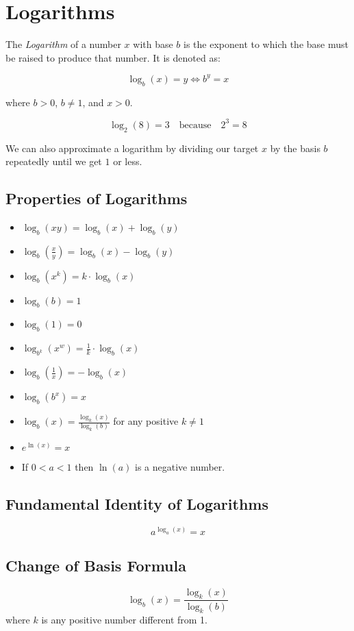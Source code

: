 \newpage
\section{Logarithms}

The \emph{Logarithm} of a number \(x\) 
with base \(b\) is the exponent to which the base must be raised to produce that number. It is denoted as:

\[
    \log_b(x) = y \iff b^y = x
\]

where \(b > 0\), \(b \neq 1\), and \(x > 0\).

\[
    \log_2(8) = 3 \quad \text{because} \quad 2^3 = 8
\]

We can also approximate a logarithm by dividing our target \(x\) by the basis \(b\) repeatedly until we get \(1\) or less.

\subsection{Properties of Logarithms}
\begin{itemize}[label=\(-\)]
  \item \(\log_b(xy) = \log_b(x) + \log_b(y)\)
  \item \(\log_b\left(\frac{x}{y}\right) = \log_b(x) - \log_b(y)\)
  \item \(\log_b(x^k) = k \cdot \log_b(x)\)
  \item \(\log_b(b) = 1\)
  \item \(\log_b(1) = 0\)
  \item \(\log_{b^k}(x^w) = \frac{1}{k} \cdot \log_b(x)\)
  \item \(\log_b\left(\frac{1}{x}\right) = -\log_b(x)\)
  \item \(\log_b(b^x) = x\)
  \item \(\log_b(x) = \frac{\log_k(x)}{\log_k(b)}\) for any positive \(k \neq 1\)
  \item \(e^{\ln(x)} = x\)
  \item If \(0 < a < 1\) then \(\ln(a)\) is a negative number. 
\end{itemize}

\subsection{Fundamental Identity of Logarithms}
\[
a^{\log_a(x)} = x
\]

\subsection{Change of Basis Formula}
\[
\log_b(x) = \frac{\log_k(x)}{\log_k(b)}
\]
where \(k\) is any positive number different from 1.

